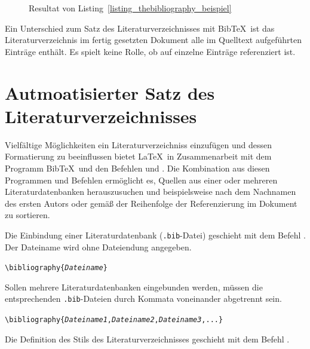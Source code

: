 \documentclass[a4paper,10pt,twoside]{scrbook}
\begin{document}
{\begin{figure}[H]
	\caption{Resultat von Listing~\ref{listing_thebibliography_beispiel}}
	\label{fig_thebibliography_beispiel}
\end{figure}

Ein Unterschied zum Satz des Literaturverzeichnisses mit Bib\TeX\ ist das Literaturverzeichnis im fertig gesetzten Dokument alle im Quelltext aufgeführten Einträge enthält. Es spielt keine Rolle, ob auf einzelne Einträge referenziert ist.






\section{Autmoatisierter Satz des Literaturverzeichnisses}
\label{Abschnitt_bibtex}

Vielfältige Möglichkeiten ein Literaturverzeichniss einzufügen und dessen Formatierung zu beeinflussen bietet \LaTeX\ in Zusammenarbeit mit dem Programm Bib\TeX\ und den Befehlen \verb|| und \verb||. Die Kombination aus diesen Programmen und Befehlen ermöglicht es, Quellen aus einer oder mehreren Literaturdatenbanken herauszusuchen und beispielsweise nach dem Nachnamen des ersten Autors oder gemäß der Reihenfolge der Referenzierung im Dokument zu sortieren. 

Die Einbindung einer Literaturdatenbank (\verb|.bib|-Datei) geschieht mit dem Befehl \verb||. Der Dateiname wird ohne Dateiendung angegeben.

\begin{boxedminipage}{\textwidth}
	\texttt{\textbackslash bibliography\{\textsl{Dateiname}\}} 
\end{boxedminipage}

Sollen mehrere Literaturdatenbanken eingebunden werden, müssen die entsprechenden \verb|.bib|-Dateien durch Kommata voneinander abgetrennt sein.

\begin{boxedminipage}{\textwidth}
	\texttt{\textbackslash bibliography\{\textsl{Dateiname1},\textsl{Dateiname2},\textsl{Dateiname3},...\}} 
\end{boxedminipage}


Die Definition des Stils des Literaturverzeichnisses geschieht mit dem Befehl \verb||.

}
\end{document}
